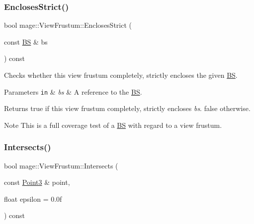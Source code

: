 \subsubsection{\texorpdfstring{Encloses\+Strict()}{EnclosesStrict()}\hspace{0.1cm}{\footnotesize\ttfamily [4/4]}}
{\footnotesize\ttfamily bool mage\+::\+View\+Frustum\+::\+Encloses\+Strict (\begin{DoxyParamCaption}\item[{const \hyperlink{structmage_1_1_b_s}{BS} \&}]{bs }\end{DoxyParamCaption}) const\hspace{0.3cm}{\ttfamily [noexcept]}}

Checks whether this view frustum completely, strictly encloses the given \hyperlink{structmage_1_1_b_s}{BS}.


\begin{DoxyParams}[1]{Parameters}
\mbox{\tt in}  & {\em bs} & A reference to the \hyperlink{structmage_1_1_b_s}{BS}. \\
\hline
\end{DoxyParams}
\begin{DoxyReturn}{Returns}
{\ttfamily true} if this view frustum completely, strictly encloses {\itshape bs}. {\ttfamily false} otherwise. 
\end{DoxyReturn}
\begin{DoxyNote}{Note}
This is a full coverage test of a \hyperlink{structmage_1_1_b_s}{BS} with regard to a view frustum. 
\end{DoxyNote}
\hypertarget{structmage_1_1_view_frustum_a68088c50a9d807df2059c1e95a0f1260}{}\label{structmage_1_1_view_frustum_a68088c50a9d807df2059c1e95a0f1260} 
\subsubsection{\texorpdfstring{Intersects()}{Intersects()}\hspace{0.1cm}{\footnotesize\ttfamily [1/4]}}
{\footnotesize\ttfamily bool mage\+::\+View\+Frustum\+::\+Intersects (\begin{DoxyParamCaption}\item[{const \hyperlink{structmage_1_1_point3}{Point3} \&}]{point,  }\item[{float}]{epsilon = {\ttfamily 0.0f} }\end{DoxyParamCaption}) const\hspace{0.3cm}{\ttfamily [noexcept]}}

